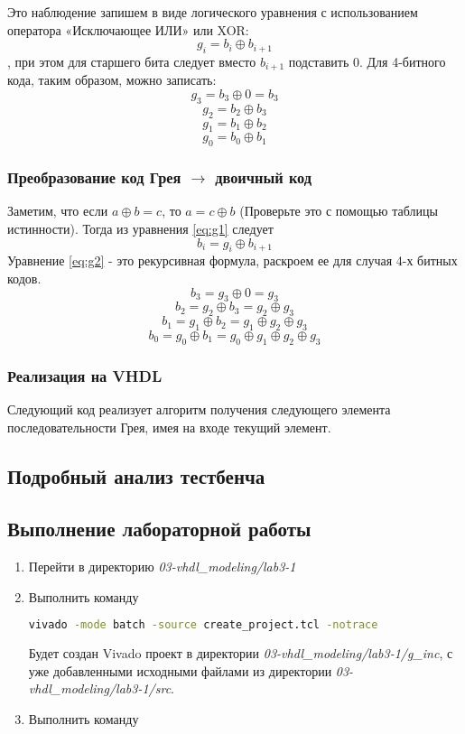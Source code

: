 Это наблюдение запишем в виде логического уравнения с использованием оператора «Исключающее ИЛИ» или XOR: 
\begin{equation}
g_{i}=b_{i} \oplus b_{i+1}
\label{eq:g1}
\end{equation}
, при этом для старшего бита следует вместо $b_{i+1}$ подставить $0$. Для 4-битного кода, таким образом, можно записать:
\[g_{3}=b_{3} \oplus 0=b_{3}\]
\[g_{2}=b_{2} \oplus b_{3}\]
\[g_{1}=b_{1} \oplus b_{2}\]
\[g_{0}=b_{0} \oplus b_{1}\]

\subsubsection{Преобразование код Грея $\to$ двоичный код}

Заметим, что если $a \oplus b = c$, то $a = c \oplus b$ (Проверьте это с помощью таблицы истинности). Тогда из уравнения \ref{eq:g1} следует
\begin{equation}
b_{i}=g_{i} \oplus b_{i+1}
\label{eq:g2}
\end{equation}
Уравнение \ref{eq:g2} - это рекурсивная формула, раскроем ее для случая 4-х битных кодов. 
\[b_{3}=g_{3} \oplus 0 = g_{3}\]
\[b_{2}=g_{2} \oplus b_{3} = g_{2} \oplus g_{3}\]
\[b_{1}=g_{1} \oplus b_{2} = g_{1} \oplus g_{2} \oplus g_{3}\]
\[b_{0}=g_{0} \oplus b_{1} = g_{0} \oplus g_{1} \oplus g_{2} \oplus g_{3}\]

\subsubsection{Реализация на VHDL}

Следующий код реализует алгоритм получения следующего элемента последовательности Грея, имея на входе текущий элемент. 

 

\subsection{Подробный анализ тестбенча}



\subsection{Выполнение лабораторной работы} 


\begin{enumerate}
\item Перейти в директорию \emph{03-vhdl\_modeling/lab3-1}
\item Выполнить команду 
\begin{lstlisting}[language = bash]
vivado -mode batch -source create_project.tcl -notrace
\end{lstlisting}
Будет создан Vivado проект в директории \emph{03-vhdl\_modeling/lab3-1/g\_inc}, с уже добавленными исходными файлами из директории \emph{03-vhdl\_modeling/lab3-1/src}.   
\item Выполнить команду 
\end{enumerate}